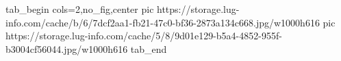  
 
 
 
 


\ifcmt
  tab_begin cols=2,no_fig,center
     pic https://storage.lug-info.com/cache/b/6/7dcf2aa1-fb21-47c0-bf36-2873a134c668.jpg/w1000h616
		 pic https://storage.lug-info.com/cache/5/8/9d01e129-b5a4-4852-955f-b3004cf56044.jpg/w1000h616
  tab_end
\fi
